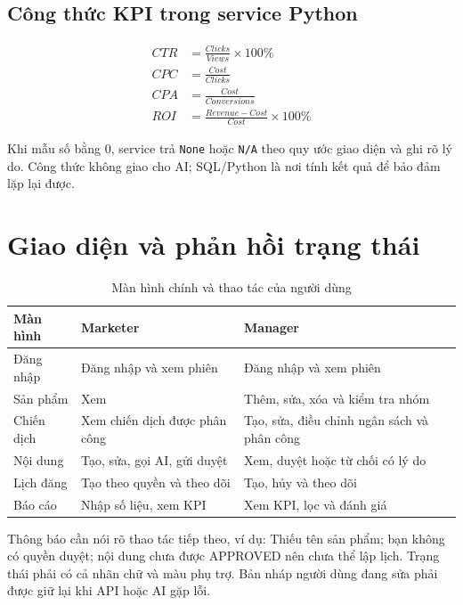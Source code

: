 \subsection{Công thức KPI trong service Python}

\begin{align}
CTR &= \frac{Clicks}{Views}\times 100\% \\
CPC &= \frac{Cost}{Clicks} \\
CPA &= \frac{Cost}{Conversions} \\
ROI &= \frac{Revenue-Cost}{Cost}\times 100\%
\end{align}

Khi mẫu số bằng 0, service trả \texttt{None} hoặc \texttt{N/A} theo quy ước giao diện và ghi rõ lý do. Công thức không giao cho AI; SQL/Python là nơi tính kết quả để bảo đảm lặp lại được.

\section{Giao diện và phản hồi trạng thái}

\begin{table}[h!]
\centering
\small
\caption{Màn hình chính và thao tác của người dùng}
\begin{tabularx}{\textwidth}{|L{3.1cm}|Y|Y|}
\hline
\textbf{Màn hình} & \textbf{Marketer} & \textbf{Manager}\\\hline
Đăng nhập & Đăng nhập và xem phiên & Đăng nhập và xem phiên\\\hline
Sản phẩm & Xem & Thêm, sửa, xóa và kiểm tra nhóm\\\hline
Chiến dịch & Xem chiến dịch được phân công & Tạo, sửa, điều chỉnh ngân sách và phân công\\\hline
Nội dung & Tạo, sửa, gọi AI, gửi duyệt & Xem, duyệt hoặc từ chối có lý do\\\hline
Lịch đăng & Tạo theo quyền và theo dõi & Tạo, hủy và theo dõi\\\hline
Báo cáo & Nhập số liệu, xem KPI & Xem KPI, lọc và đánh giá\\\hline
\end{tabularx}
\end{table}

Thông báo cần nói rõ thao tác tiếp theo, ví dụ: Thiếu tên sản phẩm; bạn không có quyền duyệt; nội dung chưa được APPROVED nên chưa thể lập lịch. Trạng thái phải có cả nhãn chữ và màu phụ trợ. Bản nháp người dùng đang sửa phải được giữ lại khi API hoặc AI gặp lỗi.

